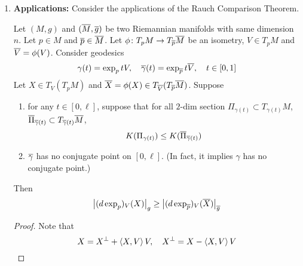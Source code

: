 \begin{enumerate}[label=\arabic{*}.]
\begin{proof}[Proof of Theorem \ref{thm:rouch}]
\begin{enumerate}[label=\Roman*.]
\begin{equation*}
			\end{equation*}
			Therefore, because $c\clo{U}$ is Jacobian and $\clo{\gamma}$ has no conjugate point, by \textbf{Lemma} \ref{lem:indexlem},
			\begin{equation*}
				\clo{I}_0^{t_0}(\Phi(U),\Phi(U)) \geq \clo{I}_0^{t_0}(c\clo{U},c\clo{U})
			\end{equation*}
			It follows that
			\begin{equation*}
				I_0^{t_0}(U,U) \geq \clo{I}_0^{t_0}(c\clo{U},c\clo{U}) = c^2\clo{I}_0^{t_0}(\clo{U},\clo{U}) \qedhere
			\end{equation*}
		\end{enumerate}
	\end{proof}

	\item \textbf{Applications:} Consider the applications of the Rauch Comparison Theorem. 
	\begin{thm}
		Let $(M,g)$ and $(\overline{M},\overline{g})$ be two Riemannian manifolds with same dimension $n$. Let $p \in M$ and $\overline{p} \in \overline{M}$. Let $\phi \colon T_pM \rightarrow T_{\overline{p}}\overline{M}$ be an isometry, $V \in T_pM$ and $\overline{V} = \phi(V)$. Consider geodesics
		\begin{equation*}
			\gamma(t) = \exp_ptV,\quad \overline{\gamma}(t) = \exp_{\overline{p}}t\overline{V},\quad t\in [0,1]
		\end{equation*}
		Let $X \in T_V(T_pM)$ and $\overline{X} = \phi(X) \in T_{\overline{V}}(T_{\overline{p}}\overline{M})$. Suppose
		\begin{enumerate}[label=(\roman*)]
			\item for any $t \in [0,\ell]$, suppose that for all $2$-dim section $\Pi_{\gamma(t)} \subset T_{\gamma(t)}M$, $\overline{\Pi}_{\overline{\gamma}(t)} \subset T_{\overline{\gamma}(t)}\overline{M}$,
			\begin{equation*}
				K(\Pi_{\gamma(t)}) \leq K(\overline{\Pi}_{\overline{\gamma}(t)})
			\end{equation*}
			\item $\clo{\gamma}$ has no conjugate point on $[0,\ell]$. (In fact, it implies $\gamma$ has no conjugate point.)
		\end{enumerate}
		Then
		\begin{equation*}
			\left\lvert(d\exp_p)_V(X)\right\lvert_g \geq \left\lvert(d\exp_{\overline{p}})_V(\overline{X})\right\lvert_{\overline{g}}
		\end{equation*}
	\end{thm}
	\begin{proof}
		Note that
		\begin{equation*}
			X = X^\perp + \inn{X,V}V,\quad X^\perp = X-\inn{X,V}V

\end{equation*}
\end{proof}
\end{enumerate}
